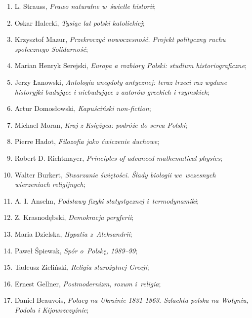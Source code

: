 \documentclass[a4paper,11pt]{article}
\begin{document}
\begin{enumerate}
\item L. Strauss, \textit{Prawo naturalne w~świetle historii};

\item Oskar Halecki, \textit{Tysiąc lat polski katolickiej};

\item Krzysztof Mazur, \textit{Przekroczyć nowoczesność. Projekt
    polityczny ruchu społecznego Solidarność};

\item Marian Henryk Serejski, \textit{Europa a rozbiory Polski: studium
    historiograficzne};

\item Jerzy Łanowski, \textit{Antologia anegdoty antycznej: teraz trzeci
    raz wydane historyjki budujące i niebudujące z autorów greckich i
    rzymskich};

\item Artur Domosłowski, \textit{Kapuściński non-fiction};

\item Michael Moran, \textit{Kraj z Księżyca: podróże do serca Polski};

\item Pierre Hadot, \textit{Filozofia jako ćwiczenie duchowe};

\item Robert D. Richtmayer, \textit{Principles of advanced mathematical
    physics};

\item Walter Burkert, \textit{Stwarzanie świętości. Ślady biologii
    we~wczesnych wierzeniach religijnych};

\item A. I. Anselm, \textit{Podstawy fizyki statystycznej
    i~termodynamiki};

\item Z. Krasnodębski, \textit{Demokracja peryferii};

\item Maria Dzielska, \textit{Hypatia z~Aleksandrii};

\item Paweł Śpiewak, \textit{Spór o~Polskę, 1989--99};

\item Tadeusz Zieliński, \textit{Religia starożytnej Grecji};

\item Ernest Gellner, \textit{Postmodernizm, rozum i~religia};

\item Daniel Beauvois, \textit{Polacy na Ukrainie 1831-1863. Szlachta
    polska na Wołyniu, Podolu i Kijowszczyźnie};


\end{enumerate}
\end{document}
